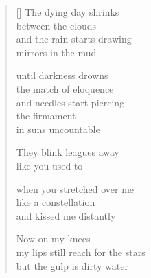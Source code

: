 \documentclass[12pt,a4paper]{article}
\begin{document}
\begin{verse}[\versewidth]
  The dying day shrinks \\
  between the clouds \\
  and the rain starts drawing \\
  mirrors in the mud

  until darkness drowns \\
  the match of eloquence \\
  and needles start piercing \\
  the firmament \\
  in suns uncountable

  They blink leagues away \\
  like you used to

  when you stretched over me \\
  like a constellation \\
  and kissed me distantly

  Now on my knees \\
  my lips still reach for the stars \\
  but the gulp is dirty water
\end{verse}


\newpage

\poemtitle{}

\settowidth{\versewidth}{to feel more alive than ever}

\bigskip
\end{document}
